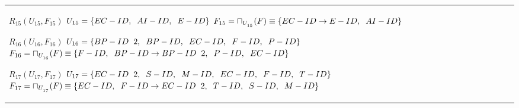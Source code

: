 \documentclass{report}
\begin{document}
\begin{tabularx}{\textwidth}{|X|}
        $ R_{15} ( U_{15} , F_{15} ) $ \newline 
        $ U_{15} = \{{EC-ID, \hspace{0.2cm}  AI-ID, \hspace{0.2cm}  E-ID}\} $ \newline 
        $ F_{15} = \sqcap_{U_{_{15}}}(F) \equiv \{EC-ID \rightarrow E-ID, \hspace{0.2cm} AI-ID \} $\newline 
        
        $ R_{16} ( U_{16} , F_{16} ) $ \newline 
        $ U_{16} = \{{BP-ID \hspace{0.2cm} 2, \hspace{0.2cm}  BP-ID, \hspace{0.2cm}  EC-ID, \hspace{0.2cm}  F-ID, \hspace{0.2cm}  P-ID}\} $ \newline 
        $ F_{16} = \sqcap_{U_{_{16}}}(F) \equiv \{F-ID, \hspace{0.2cm} BP-ID \rightarrow BP-ID \hspace{0.2cm} 2, \hspace{0.2cm} P-ID, \hspace{0.2cm} EC-ID \} $\newline 
        
        $ R_{17} ( U_{17} , F_{17} ) $ \newline 
        $ U_{17} = \{{EC-ID \hspace{0.2cm} 2, \hspace{0.2cm}  S-ID, \hspace{0.2cm}  M-ID, \hspace{0.2cm}  EC-ID, \hspace{0.2cm}  F-ID, \hspace{0.2cm}  T-ID}\} $ \newline 
        $ F_{17} = \sqcap_{U_{_{17}}}(F) \equiv \{EC-ID, \hspace{0.2cm} F-ID \rightarrow EC-ID \hspace{0.2cm} 2, \hspace{0.2cm} T-ID, \hspace{0.2cm} S-ID, \hspace{0.2cm} M-ID \} $\newline 
        

\end{tabularx}
\end{document}
